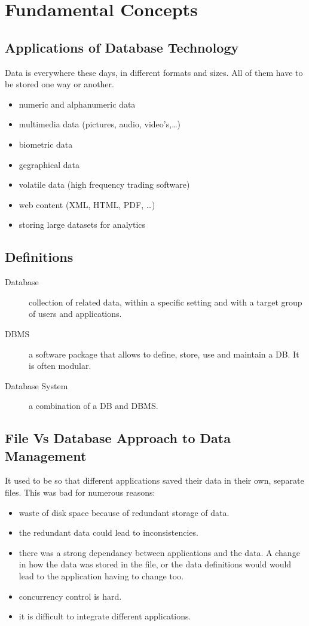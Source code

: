 \section{Fundamental Concepts}

\subsection{Applications of Database Technology}
Data is everywhere these days, in different formats and sizes. All of them have to be stored one way or another.
\begin{itemize}
  \item numeric and alphanumeric data
  \item multimedia data (pictures, audio, video's,\dots)
  \item biometric data
  \item gegraphical data
  \item volatile data (high frequency trading software)
  \item web content (XML, HTML, PDF, \dots)
  \item storing large datasets for analytics
\end{itemize}

\subsection{Definitions}
\begin{description}
  \item[Database] collection of related data, within a specific setting and with a target group of users and applications.
  \item[DBMS] a software package that allows to define, store, use and maintain a DB. It is often modular.
  \item[Database System] a combination of a DB and DBMS.
\end{description}

\subsection{File Vs Database Approach to Data Management}
It used to be so that different applications saved their data in their own, separate files. This was bad for numerous reasons:
\begin{itemize}
  \item waste of disk space because of redundant storage of data.
  \item the redundant data could lead to inconsistencies.
  \item there was a strong dependancy between applications and the data. A change in how the data was stored in the file, or the data definitions would would lead to the application having to change too.
  \item concurrency control is hard.
  \item it is difficult to integrate different applications.
\end{itemize}

